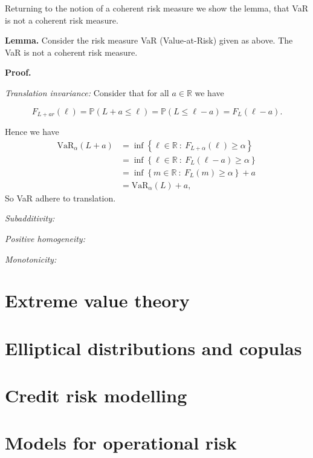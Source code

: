 \documentclass[a4paper,10pt,openany]{book}
\begin{document}
Returning to the notion of a coherent risk measure we show the lemma, that VaR is not a coherent risk measure.

\textbf{Lemma.} Consider the risk measure VaR (Value-at-Risk) given as above. The VaR is not a coherent risk measure.

\textbf{Proof.}

\emph{Translation invariance:} Consider that for all \(a\in\mathbb R\) we have

\[
F_{L+ar}(\ell)=\mathbb P(L+a\le \ell)=\mathbb P(L\le\ell - a)=F_L(\ell-a).
\]

Hence we have
\begin{align*}
\text{VaR}_\alpha(L+a)&=\inf\left\{ \ell\in\mathbb{R}\ :\ F_{L+\alpha}(\ell)\ge \alpha \right\}\\
&=\inf\left\{ \ell\in\mathbb{R}\ :\ F_{L}(\ell-a)\ge \alpha \right\}\\
&=\inf\left\{ m\in\mathbb{R}\ :\ F_{L}(m)\ge \alpha \right\}+a\\
&=\text{VaR}_\alpha(L)+a,
\end{align*}
So VaR adhere to translation.

\emph{Subadditivity:}

\emph{Positive homogeneity:}

\emph{Monotonicity:}

\hypertarget{extreme-value-theory}{%
\section{Extreme value theory}\label{extreme-value-theory}}

\hypertarget{elliptical-distributions-and-copulas}{%
\section{Elliptical distributions and copulas}\label{elliptical-distributions-and-copulas}}

\hypertarget{credit-risk-modelling}{%
\section{Credit risk modelling}\label{credit-risk-modelling}}

\hypertarget{models-for-operational-risk}{%
\section{Models for operational risk}\label{models-for-operational-risk}}
\end{document}
